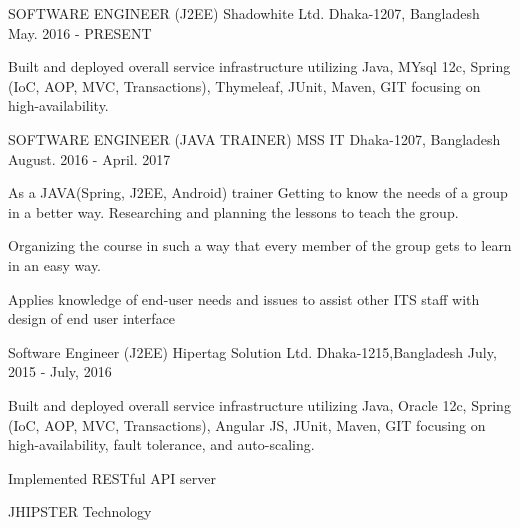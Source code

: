 

\begin{cventries}

\cventry
{SOFTWARE ENGINEER (J2EE)} %
{Shadowhite Ltd.} %
{ Dhaka-1207, Bangladesh} %
{May. 2016 - PRESENT} %
{
	\begin{cvitems} %
		\item {Built and deployed overall service infrastructure utilizing Java, MYsql 12c, Spring (IoC, AOP, MVC, Transactions), Thymeleaf, JUnit, Maven, GIT focusing
			on high-availability. }
	\end{cvitems}
}


  \cventry
    {SOFTWARE ENGINEER (JAVA TRAINER)} %
    {MSS IT} %
    { Dhaka-1207, Bangladesh} %
    {August. 2016 - April. 2017} %
    {
      \begin{cvitems} %
      	\item {As a JAVA(Spring, J2EE, Android) trainer Getting to know the needs of a group in a better way. Researching and planning the lessons to teach the group. }
      	\item { Organizing the course in such a way that every member of the group gets to learn in an easy way.}
      	\item {Applies knowledge of end-user needs and issues to assist other ITS staff with design of end user interface}
      \end{cvitems}
    }
  \cventry
    {Software Engineer (J2EE)} %
    {Hipertag Solution Ltd.} %
    {Dhaka-1215,Bangladesh} %
    { July, 2015 - July, 2016} %
    {
      \begin{cvitems}
      	\item {Built and deployed overall service infrastructure utilizing Java, Oracle 12c, Spring (IoC, AOP, MVC, Transactions), Angular JS, JUnit, Maven, GIT focusing on high-availability, fault tolerance, and auto-scaling.}
      	\item {Implemented RESTful API server}
      	\item {JHIPSTER Technology}
      \end{cvitems}
    }
\end{cventries}
